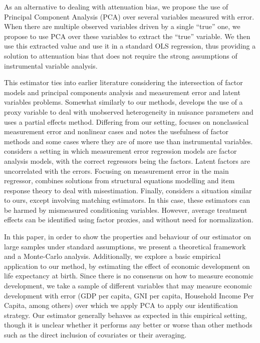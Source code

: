 \documentclass[12pt]{article}
\begin{document}
        As an alternative to dealing with attenuation bias, we propose the use of Principal Component Analysis (PCA) over several variables measured with error. When there are multiple observed variables driven by a single ``true'' one, we propose to use PCA over these variables to extract the ``true'' variable. We then use this extracted value and use it in a standard OLS regression, thus providing a solution to attenuation bias that does not require the strong assumptions of instrumental variable analysis.

        This estimator ties into earlier literature considering the intersection of factor models and principal components analysis and measurement error and latent variables problems. Somewhat similarly to our methods, \cite{nagasawa_identication_2020} develops the use of a proxy variable to deal with unobserved heterogeneity in nuisance parameters and uses a partial effects method. Differing from our setting, \cite{schennach_recent_2016} focuses on nonclassical measurement error and nonlinear cases and notes the usefulness of factor methods and some cases where they are of more use than instrumental variables. \cite{wegge_local_1996} considers a setting in which measurement error regression models are factor analysis models, with the correct regressors being the factors. Latent factors are uncorrelated with the errors. Focusing on measurement error in the main regressor, \cite{schofield_correcting_2015} combines solutions from structural equations modelling and item response theory to deal with misestimation. Finally, \cite{heckman_matching_2010} considers a situation similar to ours, except involving matching estimators. In this case, these estimators can be harmed by mismeasured conditioning variables. However, average treatment effects can be identified using factor proxies, and without need for normalization.

        In this paper, in order to show the properties and behaviour of our estimator on large samples under standard assumptions, we present a theoretical framework and a Monte-Carlo analysis. Additionally, we explore a basic empirical application to our method, by estimating the effect of economic development on life expectancy at birth. Since there is no consensus on how to measure economic development, we take a sample of different variables that may measure economic development with error (GDP per capita, GNI per capita, Household Income Per Capita, among others) over which we apply PCA to apply our identification strategy. Our estimator generally behaves as expected in this empirical setting, though it is unclear whether it performs any better or worse than other methods such as the direct inclusion of covariates or their averaging.
\end{document}
